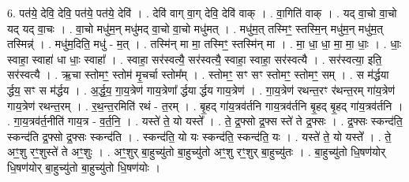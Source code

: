 \documentclass[17pt]{extarticle}
\begin{document}
6. पत॑ये॒ देवि॒ देवि॒ पत॑ये॒ पत॑ये॒ देवि॑ । . देवि॑ वाग् वा॒ग् देवि॒ देवि॑ वाक् । . वा॒गिति॑ वाक् । . यद् वा॒चो वा॒चो यद् यद् वा॒चः । . वा॒चो मधु॑म॒न् मधु॑मद् वा॒चो वा॒चो मधु॑मत् । . मधु॑म॒त् तस्मिꣳ॒॒ स्तस्मि॒न् मधु॑म॒न् मधु॑म॒त् तस्मिन्न्॑ । . मधु॑म॒दिति॒ मधु॑ - म॒त् । . तस्मि॑न् मा मा॒ तस्मिꣳ॒॒ स्तस्मि॑न् मा । . मा॒ धा॒ धा॒ मा॒ मा॒ धाः॒ । . धाः॒ स्वाहा॒ स्वाहा॑ धा धाः॒ स्वाहा᳚ । . स्वाहा॒ सर॑स्वत्यै॒ सर॑स्वत्यै॒ स्वाहा॒ स्वाहा॒ सर॑स्वत्यै । . सर॑स्वत्या॒ इति॒ सर॑स्वत्यै । . ऋ॒चा स्तोमꣳ॒॒ स्तोम॑ मृ॒चर्चा स्तोम᳚म् । . स्तोमꣳ॒॒ सꣳ सꣳ स्तोमꣳ॒॒ स्तोमꣳ॒॒ सम् । . स म॑र्द्धया र्द्धय॒ सꣳ स म॑र्द्धय । . अ॒र्द्ध॒य॒ गा॒य॒त्रेण॑ गाय॒त्रेणा᳚ र्द्धया र्द्धय गाय॒त्रेण॑ । . गा॒य॒त्रेण॑ रथन्त॒रꣳ र॑थन्त॒रम् गा॑य॒त्रेण॑ गाय॒त्रेण॑ रथन्त॒रम् । . र॒थ॒न्त॒रमिति॑ रथं - त॒रम् । . बृ॒हद् गा॑य॒त्रव॑र्तनि गाय॒त्रव॑र्तनि बृ॒हद् बृ॒हद् गा॑य॒त्रव॑र्तनि । . गा॒य॒त्रव॑र्त॒नीति॑ गाय॒त्र - व॒र्त॒नि॒ । . यस्ते॑ ते॒ यो यस्ते᳚ । . ते॒ द्र॒फ्सो द्र॒फ्स स्ते॑ ते द्र॒फ्सः । . द्र॒फ्सः स्कन्द॑ति॒ स्कन्द॑ति द्र॒फ्सो द्र॒फ्सः स्कन्द॑ति । . स्कन्द॑ति॒ यो यः स्कन्द॑ति॒ स्कन्द॑ति॒ यः । . यस्ते॑ ते॒ यो यस्ते᳚ । . ते॒ अꣳ॒॒शु रꣳ॒॒शुस्ते॑ ते अꣳ॒॒शुः । . अꣳ॒॒शुर् बा॒हुच्यु॑तो बा॒हुच्यु॑तो अꣳ॒॒शु रꣳ॒॒शुर् बा॒हुच्यु॑तः । . बा॒हुच्यु॑तो धि॒षण॑योर् धि॒षण॑योर् बा॒हुच्यु॑तो बा॒हुच्यु॑तो धि॒षण॑योः । \newline
\end{document}
